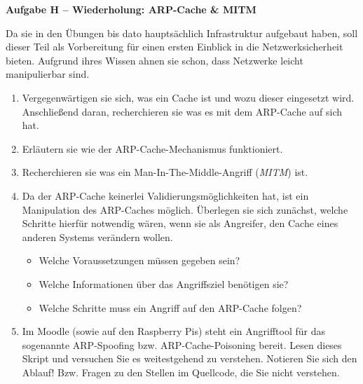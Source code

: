 \documentclass[paper=a4,fontsize=11pt]{scrartcl}%
\numberwithin{equation}{section}
\begin{document}
\begin{center}\Large{\textbf{Aufgabe H -- Wiederholung: ARP-Cache \& MITM}}\end{center}\vskip0.25in
Da sie in den Übungen bis dato hauptsächlich Infrastruktur aufgebaut haben, soll dieser Teil als Vorbereitung für einen ersten Einblick in die Netzwerksicherheit bieten. Aufgrund ihres Wissen ahnen sie schon, dass Netzwerke leicht manipulierbar sind.
\begin{enumerate}
	\item Vergegenwärtigen sie sich, was ein Cache ist und wozu dieser eingesetzt wird. Anschließend daran, recherchieren sie was es mit dem ARP-Cache auf sich hat.
	\item Erläutern sie wie der ARP-Cache-Mechanismus funktioniert.
	\item Recherchieren sie was ein Man-In-The-Middle-Angriff (\emph{MITM}) ist.
	\item Da der ARP-Cache keinerlei Validierungsmöglichkeiten hat, ist ein Manipulation des ARP-Caches möglich. Überlegen sie sich zunächst, welche Schritte hierfür notwendig wären, wenn sie als Angreifer, den Cache eines anderen Systems verändern wollen.
	\begin{itemize}
		\item Welche Voraussetzungen müssen gegeben sein?
		\item Welche Informationen über das Angriffsziel benötigen sie?
		\item Welche Schritte muss ein Angriff auf den ARP-Cache folgen?
	\end{itemize}
	\item Im Moodle (sowie auf den Raspberry Pis) steht ein Angrifftool für das sogenannte ARP-Spoofing bzw. ARP-Cache-Poisoning bereit. Lesen dieses Skript und versuchen Sie es weitestgehend zu verstehen. Notieren Sie sich den Ablauf! Bzw. Fragen zu den Stellen im Quellcode, die Sie nicht verstehen.
\end{enumerate}

\printbibliography
\end{document}
